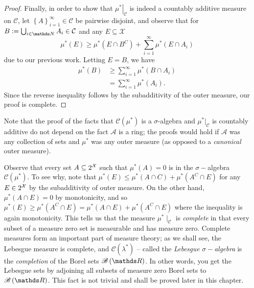\begin{proof}
Finally, in order to show that $\left.\mu^{*}\right|_{\mathcal{C}}$
is indeed a countably additive measure on $\mathcal{C}$, let $\left\{ A\right\} _{i=1}^{\infty}\in\mathcal{C}$
be pairwise disjoint, and observe that for $B:=\bigcup_{i\in\N}A_{i}\in\mathcal{C}$
and any $E\subseteq\mathcal{X}$
\[
\mu^{*}\left(E\right)\geq\mu^{*}\left(E\cap B^{C}\right)+\sum_{i=1}^{\infty}\mu^{*}\left(E\cap A_{i}\right)
\]
due to our previous work. Letting $E=B$, we have 
\begin{align*}
\mu^{*}\left(B\right) & \geq\sum_{i=1}^{\infty}\mu^{*}\left(B\cap A_{i}\right)\\
 & =\sum_{i=1}^{\infty}\mu^{*}\left(A_{i}\right).
\end{align*}
Since the reverse inequality follows by the subadditivity of the outer
measure, our proof is complete.
\end{proof}
\begin{rem}
\label{rem:noRingReqd}Note that the proof of the facts that $\mathcal{C}\left(\mu^{*}\right)$
is a $\sigma$-algebra and $\mu^{*}|_{\mathcal{C}}$ is countably
additive do not depend on the fact $\mathcal{A}$ is a ring; the proofs
would hold if $\mathcal{A}$ was any collection of sets and $\mu^{*}$
was any outer measure (as opposed to a \emph{canonical }outer measure).
\end{rem}

\begin{rem}
\label{rem:zeroOuterMeasureMeasurable}Observe that every set $A\subseteq2^{\mathcal{X}}$
such that $\mu^{*}\left(A\right)=0$ is in the $\sigma-$algebra $\mathcal{C}\left(\mu^{*}\right)$.
To see why, note that $\mu^{*}\left(E\right)\leq\mu^{*}\left(A\cap C\right)+\mu^{*}\left(A^{C}\cap E\right)$
for any $E\in2^{\mathcal{X}}$ by the subadditivity of outer measure. On the
other hand, $\mu^{*}\left(A\cap E\right)=0$ by monotonicity, and
so $\mu^{*}\left(E\right)\geq\mu^{*}\left(A^{C}\cap E\right)=\mu^{*}\left(A\cap E\right)+\mu^{*}\left(A^{C}\cap E\right)$
where the inequality is again monotonicity. This tells us that the
measure $\mu^{*}\mid_{\mathcal{C}}$ is \emph{complete }in that every
subset of a measure zero set is measurable and has measure zero. Complete
measures form an important part of measure theory; as we shall see,
the Lebesgue measure is complete, and $\mathcal{C}\left(\lambda^{*}\right)$
-- called the \emph{Lebesgue $\sigma-$algebra }is the \emph{completion
}of the Borel sets $\borel\left(\R\right)$. In other words, you get
the Lebesgue sets by adjoining all subsets of measure zero Borel sets
to $\borel\left(\R\right)$. This fact is not trivial and shall be
proved later in this chapter.
\end{rem}

